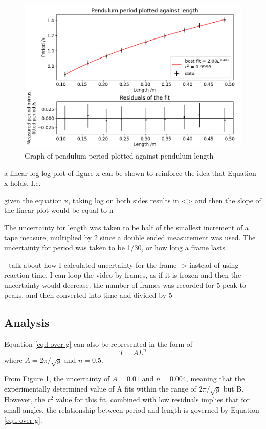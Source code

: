 \documentclass[12pt]{article}
\begin{document}
{\begin{figure}[!hptb]
    \centering
    \includegraphics[width=\textwidth]{../figures/period_vs_length.png}
    \caption{Graph of pendulum period plotted against pendulum length}
    \label{fig:figure 6}
\end{figure}

a linear log-log plot of figure x can be shown to reinforce the idea that Equation x holds. I.e.

given the equation x, taking log on both sides results in <> and then the slope of the linear plot would be equal to n

The uncertainty for length was taken to be half of the smallest increment of a tape measure, multiplied by 2 since a double ended measurement was used. The uncertainty for period was taken to be 1/30, or how long a frame lasts

- talk about how I calculated uncertainty for the frame -> instead of using reaction time, I can loop the video by frames, as if it is frozen and then the uncertainty would decrease. the number of frames was recorded for 5 peak to peaks, and then converted into time and divided by 5


\subsection{Analysis}
Equation \ref{eq:l-over-g} can also be represented in the form of
\begin{equation}
    T = AL^{n}
\end{equation}
where $A = 2\pi/\sqrt{g}$ and $n = 0.5$.

From Figure \ref{fig:figure 6}, the uncertainty of $A = 0.01$ and $n = 0.004$, meaning that the experimentally determined value of A fits within the range of $2\pi/\sqrt{g}$ but B. However, the $r^2$ value for this fit, combined with low residuals implies that for small angles, the relationship between period and length is governed by Equation \ref{eq:l-over-g}.

}
\end{document}
